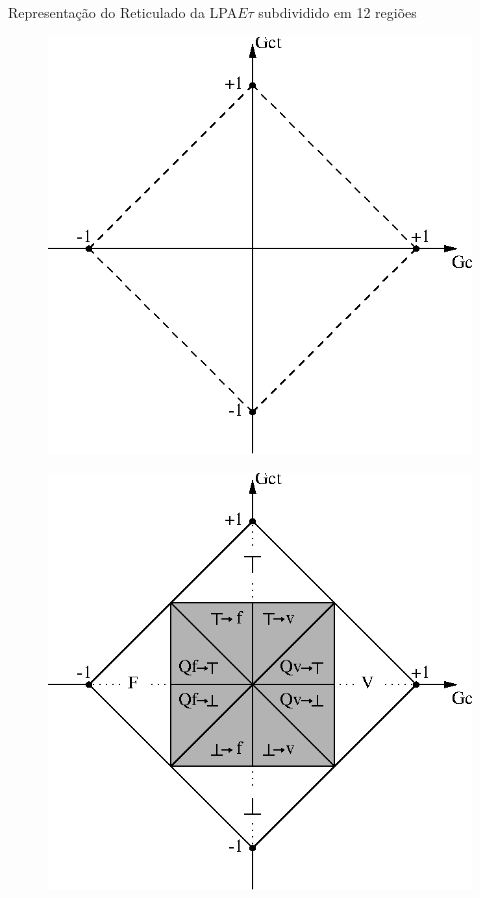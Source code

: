 \begin{frame}{Representação do Reticulado da LPA$E\tau$ {\small subdividido em 12 regiões}}
\vspace{1cm}
\begin{minipage}{0.50\linewidth}
\begin{figure}[!htb]
\center\includegraphics[scale=0.65]{./imagens/C428retasgcgct.eps}
\end{figure}
\end{minipage}
\begin{minipage}{0.45\linewidth}
\begin{figure}[!htb]
\center\includegraphics[scale=0.65]{./imagens/C430gcgct.eps}

\end{figure}
\end{minipage}
\end{frame}
